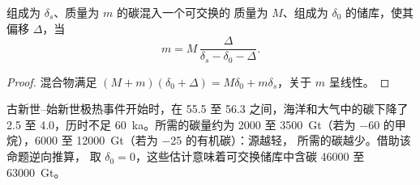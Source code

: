 \begin{proposition}[碳同位素漂移的质量]\label{prop:b3:stable-isotopes:cie-mass}
组成为 $\delta_s$、质量为 $m$ 的碳混入一个可交换的
质量为 $M$、组成为 $\delta_0$ 的储库，使其偏移 $\Delta$，当
\[
m = M\,\frac{\Delta}{\delta_s - \delta_0 - \Delta}.
\]
\end{proposition}

\begin{proof}
混合物满足 $(M + m)(\delta_0 + \Delta) = M\delta_0 + m\delta_s$，关于
$m$ 呈线性。
\end{proof}

古新世–始新世极热事件开始时，在 55.5 至
\qty{56.3}{\Ma} 之间，海洋和大气中的碳下降了 2.5 至
\qty{4.0}{\permil}，历时不足 \qty{60}{ka}。所需的碳量约为
2000 至 \qty{3500}{Gt}（若为 \qty{-60}{\permil} 的甲烷），6000 至
\qty{12000}{Gt}（若为 \qty{-25}{\permil} 的有机碳）：源越轻，
所需的碳越少。借助该命题逆向推算，
取 $\delta_0 = 0$，这些估计意味着可交换储库中含碳 \num{46000}
至 \qty{63000}{Gt}。

